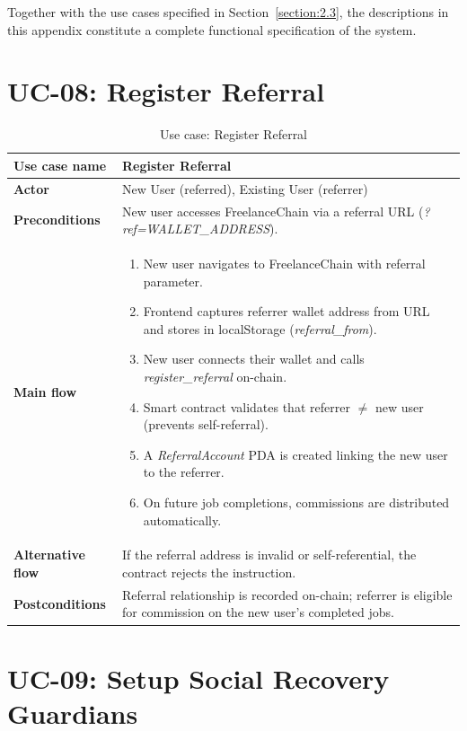 Together with the use cases specified in Section~\ref{section:2.3}, the descriptions in this appendix constitute a complete functional specification of the system.

\section*{UC-08: Register Referral}

\begin{table}[H]
\centering
\caption{Use case: Register Referral}
\begin{tabular}{|l|p{10cm}|}
\hline
\textbf{Use case name} & Register Referral \\ \hline
\textbf{Actor} & New User (referred), Existing User (referrer) \\ \hline
\textbf{Preconditions} & New user accesses FreelanceChain via a referral URL (\emph{?ref=WALLET\_ADDRESS}). \\ \hline
\textbf{Main flow} & \begin{enumerate}[noitemsep]
    \item New user navigates to FreelanceChain with referral parameter.
    \item Frontend captures referrer wallet address from URL and stores in localStorage (\emph{referral\_from}).
    \item New user connects their wallet and calls \emph{register\_referral} on-chain.
    \item Smart contract validates that referrer $\neq$ new user (prevents self-referral).
    \item A \emph{ReferralAccount} PDA is created linking the new user to the referrer.
    \item On future job completions, commissions are distributed automatically.
\end{enumerate} \\ \hline
\textbf{Alternative flow} & If the referral address is invalid or self-referential, the contract rejects the instruction. \\ \hline
\textbf{Postconditions} & Referral relationship is recorded on-chain; referrer is eligible for commission on the new user's completed jobs. \\ \hline
\end{tabular}
\end{table}

\section*{UC-09: Setup Social Recovery Guardians}

